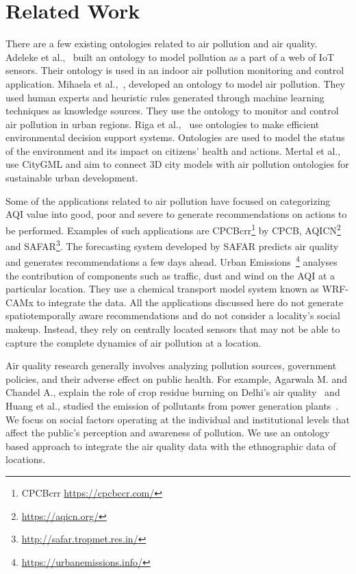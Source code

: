 \section{Related Work}
\label{sec:rel-work}


There are a few existing ontologies related to air pollution and air quality. Adeleke et al.,~\cite{adeleke} built an ontology to model pollution as a part of a web of IoT sensors. Their ontology is used in an indoor air pollution monitoring and control application. Mihaela et al.,~\cite{AIRPOLLUTIONONTO},  developed an ontology to model air pollution. They used human experts and heuristic rules generated through machine learning techniques as knowledge sources. They use the ontology to monitor and control air pollution in urban regions. Riga et al.,~\cite{marina_riga_2018_1196023} use ontologies to make efficient environmental decision support systems. Ontologies are used to model the status of the environment and its impact on citizens' health and actions. Mertal et al.,~\cite{metral} use CityGML and aim to connect 3D city models with air pollution ontologies for sustainable urban development. 

Some of the applications related to air pollution have focused on categorizing AQI value into good, poor and severe to generate recommendations on actions to be performed. Examples of such applications are CPCBcrr\footnote{CPCBcrr \url{https://cpcbccr.com/}} by CPCB, AQICN\footnote{\url{https://aqicn.org/}} and SAFAR\footnote{\url{http://safar.tropmet.res.in/}}. The forecasting system developed by SAFAR predicts air quality and generates recommendations a few days ahead. Urban Emissions~\footnote{\url{https://urbanemissions.info/}} analyses the contribution of components such as traffic, dust and wind on the AQI at a particular location. They use a chemical transport model system known as WRF-CAMx to integrate the data. All the applications discussed here do not generate spatiotemporally aware recommendations and do not consider a locality's social makeup. Instead, they rely on centrally located sensors that may not be able to capture the complete dynamics of air pollution at a location.

Air quality research generally involves analyzing pollution sources, government policies, and their adverse effect on public health. For example, Agarwala M. and Chandel A., explain the role of crop residue burning on Delhi's air quality~\cite{AGARWALA-2020-ERL} and Huang et al., studied the emission of pollutants from power generation plants~\cite{HUANG-2017-RCR}. We focus on social factors operating at the individual and institutional levels that affect the public's perception and awareness of pollution. We use an ontology based approach to integrate the air quality data with the ethnographic data of locations. %

